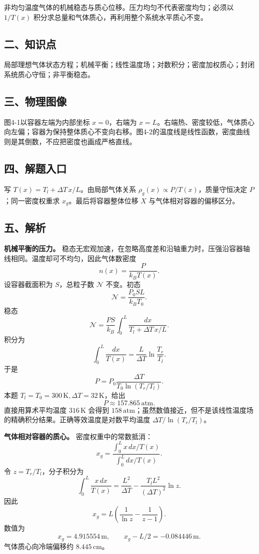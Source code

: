 \documentclass[12pt,a4paper,UTF8]{ctexart}
\begin{document}
非均匀温度气体的机械稳态与质心位移。压力均匀不代表密度均匀；必须以
\(1/T(x)\) 积分求总量和气体质心，再利用整个系统水平质心不变。

\subsection{二、知识点}\label{ux4e8cux77e5ux8bc6ux70b9-3}

局部理想气体状态方程；机械平衡；线性温度场；对数积分；密度加权质心；封闭系统质心守恒；非平衡稳态。

\subsection{三、物理图像}\label{ux4e09ux7269ux7406ux56feux50cf-3}

图4-1以容器左端为内部坐标 \(x=0\)，右端为
\(x=L\)。右端热、密度较低，气体质心向左偏；容器为保持整体质心不变向右移。图4-2的温度线是线性函数，密度曲线则是其倒数，不应把密度也画成严格直线。

\subsection{四、解题入口}\label{ux56dbux89e3ux9898ux5165ux53e3-3}

写 \(T(x)=T_l+\Delta T\,x/L\)。由局部气体关系
\(\rho_g(x)\propto P/T(x)\)，质量守恒决定 \(P\)；同一密度权重求
\(x_g\)。最后将容器整体位移 \(X\) 与气体相对容器的偏移区分。

\subsection{五、解析}\label{ux4e94ux89e3ux6790-3}

\textbf{机械平衡的压力。}
稳态无宏观加速，在忽略高度差和沿轴重力时，压强沿容器轴线相同。温度却可不均匀，因此气体数密度
\[
n(x)=\frac{P}{k_BT(x)}.
\] 设容器截面积为 \(S\)，总粒子数 \(\mathcal N\) 不变。初态 \[
\mathcal N=\frac{P_0SL}{k_BT_0}.
\] 稳态 \[
\mathcal N=\frac{PS}{k_B}\int_0^L\frac{dx}{T_l+\Delta T\,x/L}.
\] 积分为 \[
\int_0^L\frac{dx}{T(x)}
=\frac{L}{\Delta T}\ln\frac{T_r}{T_l}.
\] 于是 \[
\boxed{P=P_0\frac{\Delta T}{T_0\ln(T_r/T_l)}}.
\] 本题 \(T_l=T_0=300\,\mathrm K,\Delta T=32\,\mathrm K\)，给出 \[
\boxed{P\approx157.865\,\mathrm{atm}}.
\] 直接用算术平均温度 \(316\,\mathrm K\) 会得到
\(158\,\mathrm{atm}\)；虽然数值接近，但不是该线性温度场的精确积分结果。正确等效温度是对数平均温度
\(\Delta T/\ln(T_r/T_l)\)。

\textbf{气体相对容器的质心。} 密度权重中的常数抵消： \[
x_g=
\frac{\int_0^Lx\,dx/T(x)}
{\int_0^Ldx/T(x)}.
\] 令 \(z=T_r/T_l\)，分子积分为 \[
\int_0^L\frac{x\,dx}{T(x)}
=\frac{L^2}{\Delta T}
-\frac{T_lL^2}{(\Delta T)^2}\ln z.
\] 因此 \[
\boxed{x_g=L\left(\frac1{\ln z}-\frac1{z-1}\right)}.
\] 数值为 \[
x_g=4.915554\,\mathrm m,\qquad
x_g-L/2=-0.084446\,\mathrm m.
\] 气体质心向冷端偏移约 \(8.445\,\mathrm{cm}\)。
\end{document}
